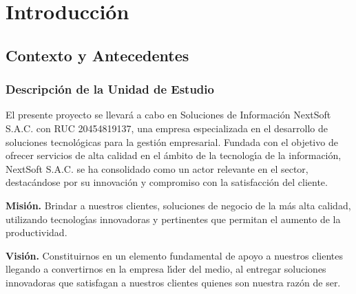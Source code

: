 \documentclass[stu, 12pt, letterpaper, donotrepeattitle, floatsintext, natbib]{apa7}
\begin{document}
\section{Introducci\'on}
\subsection{Contexto y Antecedentes}
\subsubsection{Descripci\'on de la Unidad de Estudio}
El presente proyecto se llevar\'a a cabo en Soluciones de Informaci\'on NextSoft S.A.C. con RUC 20454819137, una empresa especializada en el desarrollo de
soluciones tecnol\'ogicas para la gesti\'on empresarial.
Fundada con el objetivo de ofrecer servicios de alta calidad en el \'ambito de la tecnolog\'{\i}a de la informaci\'on, NextSoft S.A.C. se ha consolidado como un
actor relevante en el sector, destac\'andose por su innovaci\'on y compromiso con la satisfacci\'on del cliente.

\textbf{Misi\'on. }Brindar a nuestros clientes, soluciones de negocio de la m\'as alta calidad, utilizando tecnolog\'{\i}as innovadoras y pertinentes que permitan
el aumento de la productividad.

\textbf{Visi\'on. }Constituirnos en un elemento fundamental de apoyo a nuestros clientes llegando a convertirnos en la empresa l\'{\i}der del medio, al entregar
soluciones innovadoras que satisfagan a nuestros clientes quienes son nuestra raz\'on de ser.
\end{document}

